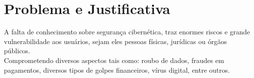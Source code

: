 \section{Problema e Justificativa}
\label{justificativa}

 A falta de conhecimento sobre segurança cibernética, traz enormes riscos e grande vulnerabilidade aos usuários, sejam eles pessoas físicas, jurídicas ou órgãos públicos.\cite{navint} \\
 Comprometendo diversos aspectos tais como: roubo de dados, fraudes em pagamentos, diversos tipos de golpes financeiros, vírus digital, entre outros. \cite{virus}

